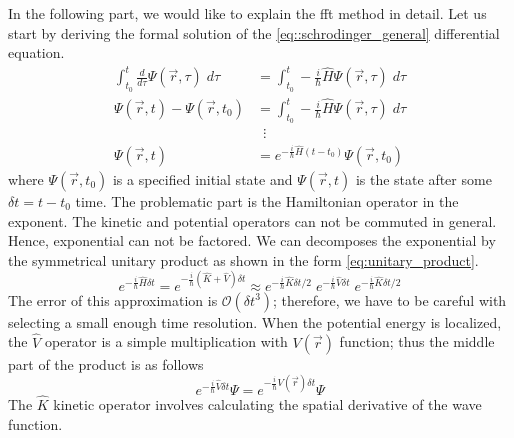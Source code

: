 In the following part, we would like to explain the \acrshort{fft} method in detail.
Let us start by deriving the formal solution of the \ref{eq::schrodinger_general} differential equation.
\begin{equation}
	\label{eq:formal_solution}
	\begin{split}
		\int_{t_0}^t \frac{d}{d\tau}\Psi(\vec{r}, \tau) \; d\tau &= \int_{t_0}^t -\frac{i}{\hbar}\hat{H}\Psi(\vec{r}, \tau)\; d\tau\\
		\Psi(\vec{r}, t) - \Psi(\vec{r}, t_0) &= \int_{t_0}^t -\frac{i}{\hbar}\hat{H}\Psi(\vec{r}, \tau)\; d\tau\\
		&\;\:\vdots\\
		\Psi(\vec{r}, t) &= e^{-\frac{i}{\hbar}\hat{H}(t - t_0)} \Psi(\vec{r}, t_0)
	\end{split}
\end{equation}
where $\Psi(\vec{r}, t_0)$ is a specified initial state and $\Psi(\vec{r}, t)$ is the state after some $\delta t = t - t_0$ time.
The problematic part is the Hamiltonian operator in the exponent.
The kinetic and potential operators can not be commuted in general. Hence, exponential can not be factored.
We can decomposes the exponential by the symmetrical unitary product \cite{Fleck1976, FEIT1982412} as shown in the form \ref{eq:unitary_product}.
\begin{equation}
	\label{eq:unitary_product}
	e^{-\frac{i}{\hbar}\hat{H}\delta t} = e^{-\frac{i}{\hbar}(\hat{K} + \hat{V})\delta t} \approx e^{-\frac{i}{\hbar}\hat{K}\delta t / 2}\; e^{-\frac{i}{\hbar}\hat{V}\delta t}\; e^{-\frac{i}{\hbar}\hat{K}\delta t / 2}
\end{equation}
The error of this approximation is $\mathcal{O}(\delta t^3)$; therefore, we have to be careful with selecting a small enough time resolution.
When the potential energy is localized, the $\hat{V}$ operator is a simple multiplication with $V(\vec{r})$ function; thus the middle part of the product is as follows
\begin{equation}
	\label{eq:potential_prop}
	e^{-\frac{i}{\hbar}\hat{V}\delta t} \Psi = e^{-\frac{i}{\hbar}V(\vec{r})\delta t} \Psi
\end{equation}
The $\hat{K}$ kinetic operator involves calculating the spatial derivative of the wave function.

